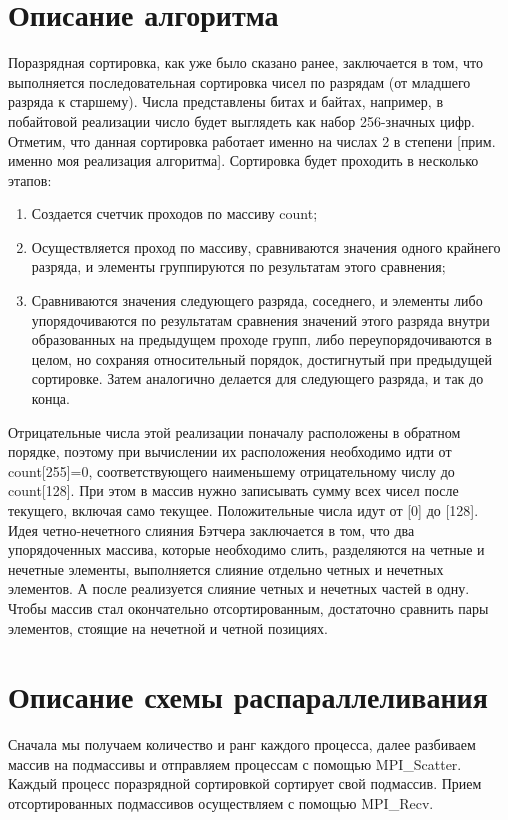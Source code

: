 \documentclass{report}
\begin{document}
\section*{Описание алгоритма}
\par Поразрядная сортировка, как уже было сказано ранее, заключается в том, что выполняется последовательная сортировка чисел по разрядам (от младшего разряда к старшему). Числа представлены битах и байтах, например, в побайтовой реализации число будет выглядеть как набор 256-значных цифр. Отметим, что данная сортировка работает именно на числах 2 в степени [прим. именно моя реализация алгоритма].
Сортировка будет проходить в несколько этапов:
\begin{enumerate} 
 \item Создается счетчик проходов по массиву count;
\item Осуществляется проход по массиву, сравниваются значения одного крайнего разряда, и элементы группируются по результатам этого сравнения;
\item Сравниваются значения следующего разряда, соседнего, и элементы либо упорядочиваются по результатам сравнения значений этого разряда внутри образованных на предыдущем проходе групп, либо переупорядочиваются в целом, но сохраняя относительный порядок, достигнутый при предыдущей сортировке. Затем аналогично делается для следующего разряда, и так до конца.
\end{enumerate}
Отрицательные числа этой реализации поначалу расположены в обратном порядке, поэтому при вычислении их расположения необходимо идти от count[255]=0, соответствующего наименьшему отрицательному числу до count[128]. При этом в массив нужно записывать сумму всех чисел после текущего, включая само текущее. Положительные числа идут от [0] до [128].
Идея четно-нечетного слияния Бэтчера заключается в том, что два упорядоченных
массива, которые необходимо слить, разделяются на четные и нечетные элементы, выполняется слияние отдельно четных и нечетных элементов. А после реализуется слияние четных и нечетных частей в одну. Чтобы массив стал окончательно
отсортированным, достаточно сравнить пары элементов, стоящие на нечетной и четной
позициях.
\newpage
\section*{Описание схемы распараллеливания}
\par Сначала мы получаем количество и ранг каждого процесса, далее разбиваем массив на подмассивы и отправляем процессам с помощью MPI\_Scatter. Каждый процесс поразрядной сортировкой сортирует свой подмассив.
Прием отсортированных подмассивов осуществляем с помощью MPI\_Recv.
\newpage
\end{document}
